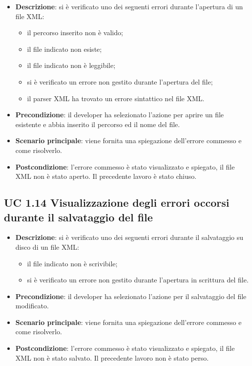 		\begin{itemize}
			\item\textbf{Descrizione}: si è verificato uno dei seguenti errori durante l'apertura di un file XML:
			\begin{itemize}
				\item il percorso inserito non è valido;
				\item il file indicato non esiste;
				\item il file indicato non è leggibile;
				\item si è verificato un errore non gestito durante l'apertura del file;
				\item il parser XML ha trovato un errore sintattico nel file XML.
			\end{itemize}
			\item\textbf{Precondizione}: il developer ha selezionato l'azione per aprire un file esistente e abbia inserito il percorso ed il nome del file.
			\item\textbf{Scenario principale}: viene fornita una spiegazione dell'errore commesso e come risolverlo.
			\item\textbf{Postcondizione}: l'errore commesso è stato visualizzato e spiegato, il file XML non è stato aperto. Il precedente lavoro è stato chiuso.
		\end{itemize}
		
	\subsection{UC 1.14 Visualizzazione degli errori occorsi durante il salvataggio del file}
		\label{subsec:XEUC1.14}
		
		\begin{itemize}
			\item\textbf{Descrizione}: si è verificato uno dei seguenti errori durante il salvataggio su disco di un file XML:
			\begin{itemize}
				\item il file indicato non è scrivibile;
				\item si è verificato un errore non gestito durante l'apertura in scrittura del file.
			\end{itemize}
			\item\textbf{Precondizione}: il developer ha selezionato l'azione per il salvataggio del file modificato.
			\item\textbf{Scenario principale}: viene fornita una spiegazione dell'errore commesso e come risolverlo.
			\item\textbf{Postcondizione}: l'errore commesso è stato visualizzato e spiegato, il file XML non è stato salvato. Il precedente lavoro non è stato perso.
		\end{itemize}
		
